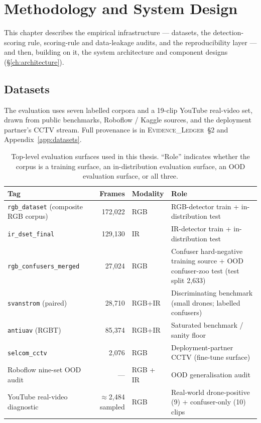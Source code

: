 \chapter{Methodology and System Design}
\label{ch:methodology}

This chapter describes the empirical infrastructure --- datasets, the detection-scoring rule, scoring-rule and data-leakage audits, and the reproducibility layer --- and then, building on it, the system architecture and component designs (\S\ref{ch:architecture}).

\section{Datasets}
\label{sec:datasets}

The evaluation uses seven labelled corpora and a 19-clip YouTube real-video set, drawn from public benchmarks, Roboflow / Kaggle sources, and the deployment partner's CCTV stream. Full provenance is in \textsc{Evidence\_Ledger}~\S2 and Appendix~\ref{app:datasets}.

\begin{table}[htbp]
    \centering
    \caption{Top-level evaluation surfaces used in this thesis. ``Role'' indicates whether the corpus is a training surface, an in-distribution evaluation surface, an OOD evaluation surface, or all three.}
    \label{tab:datasets}
    \begin{tabular}{lrlp{5.6cm}}
        \toprule
        Tag & Frames & Modality & Role \\
        \midrule
        \texttt{rgb\_dataset} (composite RGB corpus) & 172,022 & RGB & RGB-detector train + in-distribution test \\
        \texttt{ir\_dset\_final} & 129,130 & IR & IR-detector train + in-distribution test \\
        \texttt{rgb\_confusers\_merged} & 27,024 & RGB & Confuser hard-negative training source + OOD confuser-zoo test (test split 2{,}633) \\
        \texttt{svanstrom} (paired) & 28,710 & RGB+IR & Discriminating benchmark (small drones; labelled confusers) \\
        \texttt{antiuav} (RGBT) & 85,374 & RGB+IR & Saturated benchmark / sanity floor \\
        \texttt{selcom\_cctv} & 2,076 & RGB & Deployment-partner CCTV (fine-tune surface) \\
        Roboflow nine-set OOD audit & --- & RGB + IR & OOD generalisation audit \\
        YouTube real-video diagnostic & $\approx$2{,}484 sampled & RGB & Real-world drone-positive (9) + confuser-only (10) clips \\
        \bottomrule
    \end{tabular}
\end{table}

